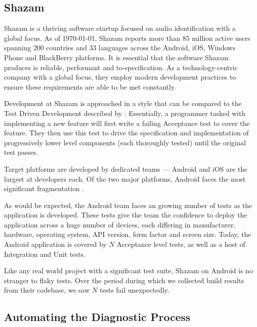 \subsection{Shazam}

Shazam is a thriving software startup focused on audio identification with a global focus. As of \today, Shazam reports more than 85 million active users spanning 200 countries and 33 languages across the Android, iOS, Windows Phone and BlackBerry platforms. It is essential that the software Shazam produces is reliable, performant and to-specification. As a technology-centric company with a global focus, they employ modern development practices to ensure these requirements are able to be met constantly.

Development at Shazam is approached in a style that can be compared to the Test Driven Development described by \citet*{freeman2009growing}. Essentially, a programmer tasked with implementing a new feature will first write a failing Acceptance test to cover the feature. They then use this test to drive the specification and implementation of progressively lower level components (each thoroughly tested) until the original test passes.

Target platforms are developed by dedicated teams --- Android and iOS are the largest at  developers each. Of the two major platforms, Android faces the most significant fragmentation \cite{AndroidFragmentationVisualized}.

As would be expected, the Android team faces an growing number of tests as the application is developed.  These tests give the team the confidence to deploy the application across a huge number of devices, each differing in manufacturer, hardware, operating system, API version, form factor and screen size. Today, the Android application is covered by $N$  Acceptance level tests, as well as a host of Integration and Unit tests.

Like any real world project with a significant test suite, Shazam on Android is no stranger to flaky tests. Over the period  during which we collected build results from their codebase, we saw $N$ tests fail unexpectedly.


\subsection{Automating the Diagnostic Process}

